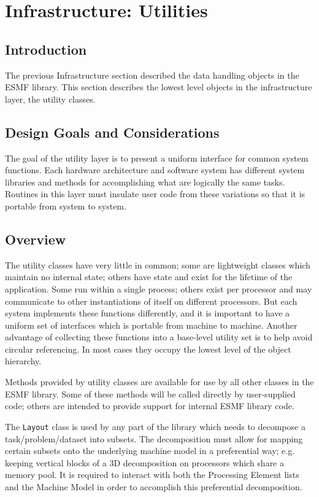 \section{Infrastructure: Utilities}
\label{sec:utilclasses}

\subsection{Introduction}

The previous Infrastructure section described the data handling 
objects in the ESMF library. This section describes the lowest level
objects in the infrastructure layer, the utility classes.

\subsection{Design Goals and Considerations}

The goal of the utility layer is to present a uniform interface
for common system functions.  Each hardware architecture and
software system has different system libraries and methods
for accomplishing what are logically the same tasks.  Routines
in this layer must insulate user code from these variations so that it is
portable from system to system.

\subsection{Overview}

The utility classes have very little in common;
some are lightweight classes which maintain no internal state; 
others have state and exist for the lifetime of the application.  
Some run within a single process; others exist per processor and 
may communicate to other instantiations of itself on different processors.
But each system implements these functions differently, and it
is important to have a uniform set of interfaces which
is portable from machine to machine.
Another advantage of collecting these functions 
into a base-level utility set is to help avoid circular referencing.
In most cases they occupy the lowest level of the object hierarchy.

Methods provided by utility classes are available for use by  
all other classes in the ESMF library.  
Some of these methods will be called directly by user-supplied
code; others are intended to provide support for internal ESMF 
library code.

The {\tt Layout} class is used by any part of the library which needs
to decompose a task/problem/dataset into subsets.
The decomposition must allow for mapping certain subsets onto the
underlying machine model in a preferential way; e.g. keeping
vertical blocks of a 3D decomposition on processors which share
a memory pool.
It is required to interact with both the Processing Element lists
and the Machine Model in order to accomplish this preferential
decomposition.


